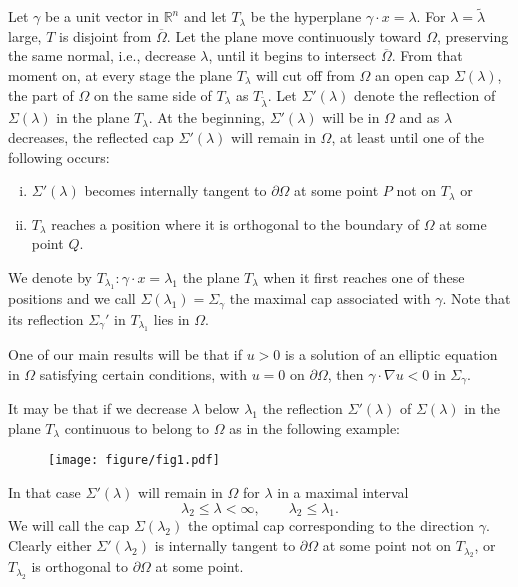 Let $\gamma$ be a unit vector in $\mathbb{R}^n$ and let $T_{\lambda}$ be the
hyperplane $\gamma\cdot x = \lambda$. For $\lambda=\tilde{\lambda}$ large,
$T$ is disjoint from $\overline{\Omega}$.
Let the plane move continuously toward $\Omega$,
preserving the same normal, i.e., decrease $\lambda$,
until it begins to intersect $\overline{\Omega}$.
From that moment on, at every stage the plane $T_{\lambda}$ will cut off from $\Omega$
an open cap $\Sigma(\lambda)$, the part of $\Omega$ on
the same side of $T_{\lambda}$ as $T_{\tilde{\lambda}}$.
Let $\Sigma'(\lambda)$ denote the reflection of $\Sigma(\lambda)$ in the plane $T_{\lambda}$.
At the beginning, $\Sigma'(\lambda)$ will be in $\Omega$ and as $\lambda$ decreases,
the reflected cap $\Sigma'(\lambda)$ will remain in $\Omega$,
at least until one of the following occurs:

\begin{enumerate}[(i)]
  \item $\Sigma'(\lambda)$ becomes internally tangent to $\partial\Omega$ at some point $P$
    not on $T_\lambda$ or
  \item $T_\lambda$ reaches a position where it is orthogonal to the boundary of $\Omega$
    at some point $Q$.
\end{enumerate}

We denote by $T_{\lambda_1}: \gamma\cdot x = \lambda_1$ the plane $T_\lambda$
when it first reaches one of these positions and we call $\Sigma(\lambda_1)=\Sigma_{\gamma}$
the maximal cap associated with $\gamma$. Note that its reflection $\Sigma_{\gamma}'$
in $T_{\lambda_1}$ lies in $\Omega$.

One of our main results will be that if $u > 0$ is a solution of an elliptic equation
in $\Omega$ satisfying certain conditions, with $u = 0$ on $\partial\Omega$,
then $\gamma\cdot\nabla u<0$ in $\Sigma_\gamma$.

It may be that if we decrease $\lambda$ below $\lambda_1$
the reflection $\Sigma'(\lambda)$ of $\Sigma(\lambda)$ in the plane $T_\lambda$
continuous to belong to $\Omega$ as in the following example:

\begin{figure}[htbp]
  \centering
  \texttt{[image: figure/fig1.pdf]}
  \caption{}
  \label{fig:1}
\end{figure}

In that case $\Sigma'(\lambda)$ will remain in $\Omega$ for $\lambda$ in a maximal interval
\[\lambda_2\leq\lambda<\infty,\qquad \lambda_2\leq\lambda_1.\]
We will call the cap $\Sigma(\lambda_2)$ the optimal cap corresponding to the direction $\gamma$. 
Clearly either $\Sigma'(\lambda_2)$ is internally tangent to $\partial\Omega$ 
at some point not on $T_{\lambda_2}$, or $T_{\lambda_2}$ is orthogonal to
$\partial\Omega$ at some point.


